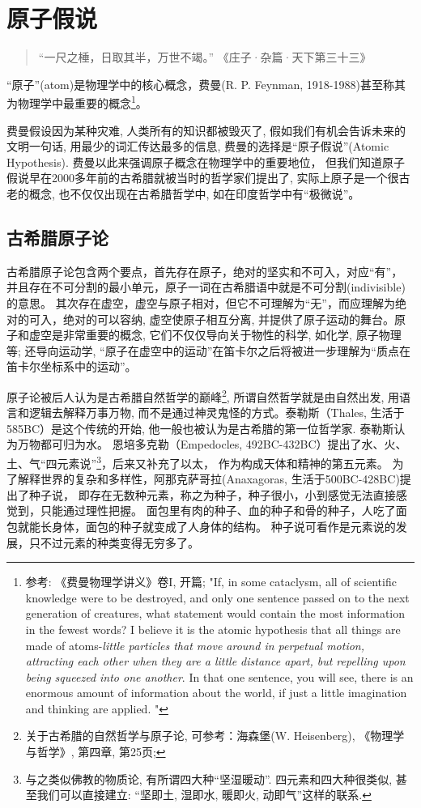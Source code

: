 \section{原子假说}

\begin{quotation}
“一尺之棰，日取其半，万世不竭。” \qquad 《庄子·杂篇·天下第三十三》
\end{quotation}


“原子”(atom)是物理学中的核心概念，费曼(R. P. Feynman,
1918-1988)甚至称其为物理学中最重要的概念\footnote{参考:
《费曼物理学讲义》卷I, 开篇; "If, in some cataclysm, all of scientific knowledge were to be
destroyed, and only one sentence passed on to the next generation of
creatures, what statement would contain the most information in the
fewest words? I believe it is the atomic  hypothesis that all things
are made of atoms-\emph{little particles that move around in
perpetual motion, attracting each other when they are a little
distance apart, but repelling upon being squeezed into one another}.
In that one sentence, you will see, there is an enormous amount of
information about the world, if just a little imagination and
thinking are applied.
"}。


费曼假设因为某种灾难, 人类所有的知识都被毁灭了,
假如我们有机会告诉未来的文明一句话, 用最少的词汇传达最多的信息,
费曼的选择是“原子假说”(Atomic Hypothesis).
费曼以此来强调原子概念在物理学中的重要地位，
但我们知道原子假说早在2000多年前的古希腊就被当时的哲学家们提出了,
实际上原子是一个很古老的概念, 也不仅仅出现在古希腊哲学中,
如在印度哲学中有“极微说”。

\subsection{古希腊原子论}

古希腊原子论包含两个要点，首先存在原子，绝对的坚实和不可入，对应“有”，
并且存在不可分割的最小单元，原子一词在古希腊语中就是不可分割(indivisible)的意思。
其次存在虚空，虚空与原子相对，但它不可理解为“无”，而应理解为绝对的可入，绝对的可以容纳,
虚空使原子相互分离,
并提供了原子运动的舞台。原子和虚空是非常重要的概念,
它们不仅仅导向关于物性的科学, 如化学, 原子物理等; 还导向运动学,
“原子在虚空中的运动”在笛卡尔之后将被进一步理解为“质点在笛卡尔坐标系中的运动”。

原子论被后人认为是古希腊自然哲学的巅峰\footnote{关于古希腊的自然哲学与原子论,
可参考：海森堡(W. Heisenberg), 《物理学与哲学》, 第四章, 第25页;},
所谓自然哲学就是由自然出发, 用语言和逻辑去解释万事万物,
而不是通过神灵鬼怪的方式。泰勒斯（Thales,
生活于585BC）是这个传统的开始, 他一般也被认为是古希腊的第一位哲学家.
泰勒斯认为万物都可归为水。 恩培多克勒（Empedocles,
492BC-432BC）提出了水、火、土、气“四元素说”\footnote{与之类似佛教的物质论,
有所谓四大种“坚湿暖动”. 四元素和四大种很类似,
甚至我们可以直接建立: “坚即土, 湿即水, 暖即火, 动即气”这样的联系.
}，后来又补充了以太， 作为构成天体和精神的第五元素。
为了解释世界的复杂和多样性，阿那克萨哥拉(Anaxagoras,
生活于500BC-428BC)提出了种子说，
即存在无数种元素，称之为种子，种子很小，小到感觉无法直接感觉到，只能通过理性把握。
面包里有肉的种子、血的种子和骨的种子，人吃了面包就能长身体，面包的种子就变成了人身体的结构。
种子说可看作是元素说的发展，只不过元素的种类变得无穷多了。

